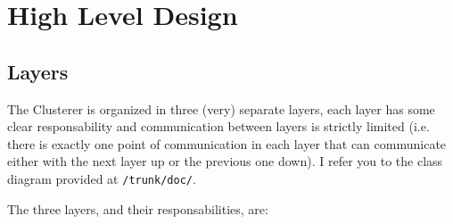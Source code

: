 \documentclass[a4paper]{article}
\begin{document}
\section{High Level Design}

\subsection{Layers}

The Clusterer is organized in three (very) separate layers, each layer has some clear responsability and communication between layers is strictly limited (i.e. there is exactly one point of communication in each layer that can communicate either with the next layer up or the previous one down).  I refer you to the class diagram provided at \texttt{/trunk/doc/}.

The three layers, and their responsabilities, are:
\end{document}
